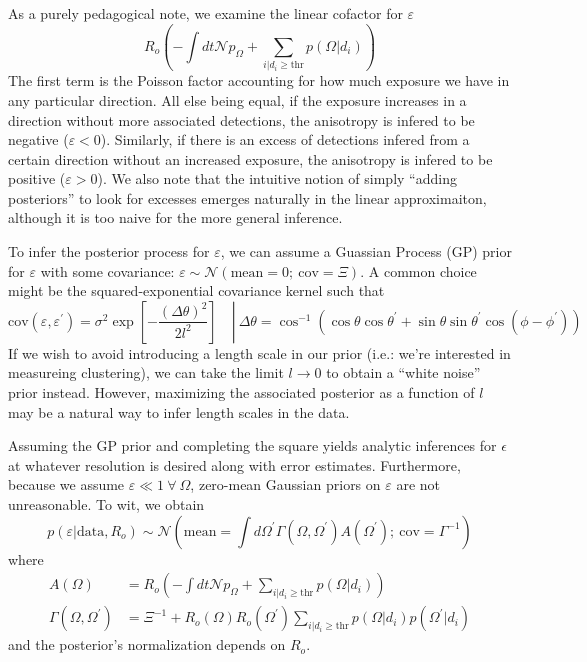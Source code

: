 \documentclass{article}
\begin{document}
As a purely pedagogical note, we examine the linear cofactor for $\varepsilon$
\begin{equation}\label{eq:linear cofactor}
    R_o \left( - \int dt \mathcal{N} p_\Omega + \sum\limits_{i|d_i\geq\mathrm{thr}} p(\Omega|d_i)\right)
\end{equation}
The first term is the Poisson factor accounting for how much exposure we have in any particular direction. 
All else being equal, if the exposure increases in a direction without more associated detections, the anisotropy is infered to be negative ($\varepsilon < 0$). 
Similarly, if there is an excess of detections infered from a certain direction without an increased exposure, the anisotropy is infered to be positive ($\varepsilon > 0$).
We also note that the intuitive notion of simply ``adding posteriors'' to look for excesses emerges naturally in the linear approximaiton, although it is too naive for the more general inference.

To infer the posterior process for $\varepsilon$, we can assume a Guassian Process (GP) prior for $\varepsilon$ with some covariance: $\varepsilon \sim \mathcal{N}\left(\mathrm{mean}=0;\ \mathrm{cov}=\Xi\right)$.
A common choice might be the squared-exponential covariance kernel such that
\begin{equation}
    \left. \text{cov}(\varepsilon, \varepsilon^\prime) = \sigma^2 \exp \left[ -\frac{\left(\Delta \theta\right)^2}{2l^2}\right] \quad  \right| \ \Delta \theta = \cos^{-1}\left(\cos\theta\cos\theta^\prime + \sin\theta\sin\theta^\prime\cos(\phi-\phi^\prime)\right)
\end{equation}
If we wish to avoid introducing a length scale in our prior (i.e.: we're interested in measureing clustering), we can take the limit $l \rightarrow 0$ to obtain a ``white noise'' prior instead.
However, maximizing the associated posterior as a function of $l$ may be a natural way to infer length scales in the data.

Assuming the GP prior and completing the square yields analytic inferences for $\epsilon$ at whatever resolution is desired along with error estimates.
Furthermore, because we assume $\varepsilon \ll 1 \ \forall \ \Omega$, zero-mean Gaussian priors on $\varepsilon$ are not unreasonable.
To wit, we obtain
\begin{equation}
    p(\varepsilon|\mathrm{data}, R_o) \sim \mathcal{N}\left( \mathrm{mean}=\int d\Omega^\prime \Gamma(\Omega, \Omega^\prime) A(\Omega^\prime);\ \mathrm{cov}=\Gamma^{-1}\right)
\end{equation}
where
\begin{align}
    A(\Omega) & = R_o\left( -\int dt\mathcal{N}p_\Omega + \sum\limits_{i|d_i\geq\mathrm{thr}} p(\Omega|d_i) \right) \\
    \Gamma(\Omega, \Omega^\prime) & = \Xi^{-1} + R_o(\Omega) R_o(\Omega^\prime) \sum\limits_{i|d_i\geq\mathrm{thr}} p(\Omega|d_i)p(\Omega^\prime|d_i)
\end{align}
and the posterior's normalization depends on $R_o$.
\end{document}
